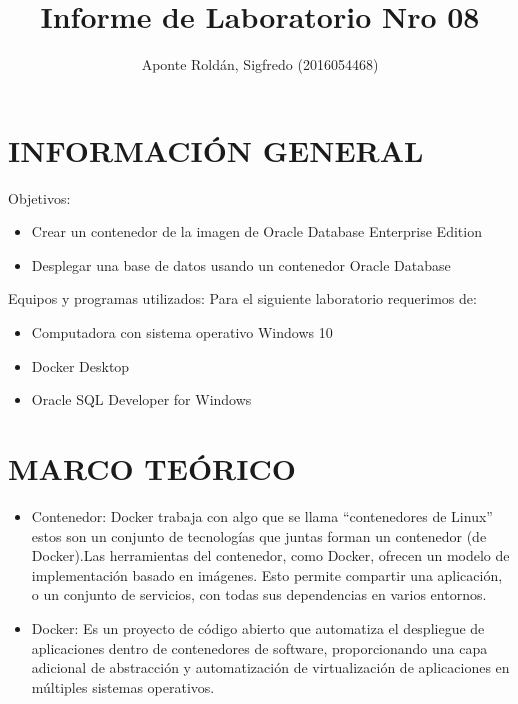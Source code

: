 \documentclass[preprint,12pt]{elsarticle}
\begin{document}
	\begin{frontmatter}
		\title{\huge Informe de Laboratorio Nro 08}
		\address{Universidad Privada de Tacna}
		\address{Escuela Profesional de Ingeniería de Sistemas}
		\address{Curso : Base de Datos II}		
		\author{Aponte Roldán, Sigfredo              	(2016054468)}		
		\address{Tacna, Perú}
\end{frontmatter}

\section{INFORMACIÓN GENERAL}
Objetivos:
\begin{itemize}
\item Crear un contenedor de la imagen de Oracle Database Enterprise Edition 
\item Desplegar una base de datos usando un contenedor Oracle Database
\end{itemize}
Equipos y programas utilizados:
Para el siguiente laboratorio requerimos de:
\begin{itemize}
\item Computadora con sistema operativo Windows 10
\item Docker Desktop
\item Oracle SQL Developer for Windows

\end{itemize}

\section{MARCO TEÓRICO}
\begin{itemize}
\item Contenedor: Docker trabaja con algo que se llama “contenedores de Linux” estos son un conjunto de tecnologías que juntas forman un contenedor (de Docker).Las herramientas del contenedor, como Docker, ofrecen un modelo de implementación basado en imágenes. Esto permite compartir una aplicación, o un conjunto de servicios, con todas sus dependencias en varios entornos.
\item Docker: Es un proyecto de código abierto que automatiza el despliegue de aplicaciones dentro de contenedores de software, proporcionando una capa adicional de abstracción y automatización de virtualización de aplicaciones en múltiples sistemas operativos.
\end{itemize}
\end{document}
